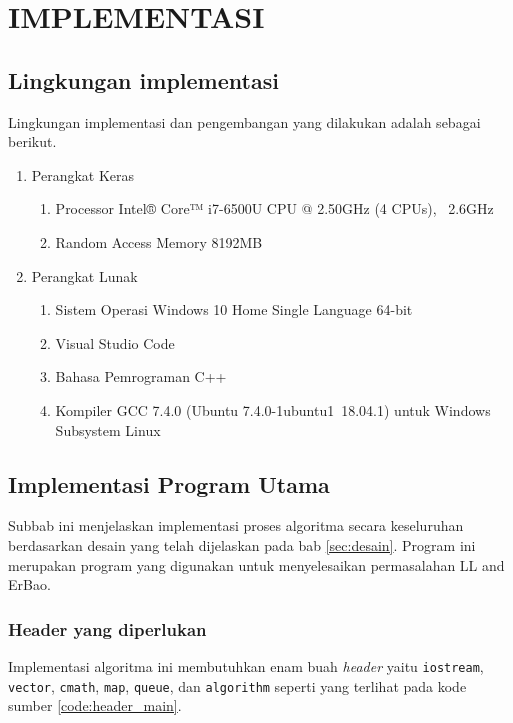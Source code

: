 \chapter {IMPLEMENTASI}

\section{ Lingkungan implementasi}

Lingkungan implementasi dan pengembangan yang dilakukan adalah sebagai berikut.
\begin{enumerate}
	\item Perangkat Keras
	\begin{enumerate}
		\item Processor Intel® Core™ i7-6500U CPU @ 2.50GHz (4 CPUs), ~2.6GHz
		\item Random Access Memory 8192MB
	\end{enumerate}
	\item Perangkat Lunak
	\begin{enumerate}
		\item Sistem Operasi Windows 10 Home Single Language 64-bit
		\item Visual Studio Code
		\item Bahasa Pemrograman C++
		\item Kompiler GCC 7.4.0 (Ubuntu 7.4.0-1ubuntu1~18.04.1) untuk Windows Subsystem Linux
	\end{enumerate}
\end{enumerate}

\section{ Implementasi Program Utama}

Subbab ini menjelaskan implementasi proses algoritma secara keseluruhan berdasarkan desain yang telah dijelaskan pada bab \ref{sec:desain}. Program ini merupakan program yang digunakan untuk menyelesaikan permasalahan LL and ErBao.

\subsection{ Header yang diperlukan}
Implementasi algoritma ini membutuhkan enam buah \textit{header} yaitu \texttt{iostream}, \texttt{vector}, \texttt{cmath}, \texttt{map}, \texttt{queue}, dan \texttt{algorithm} seperti yang terlihat pada kode sumber \ref{code:header_main}.

